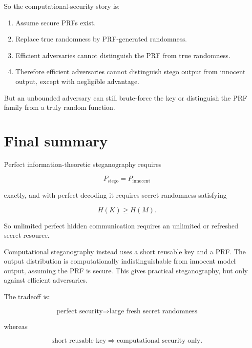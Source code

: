 \documentclass[11pt]{article}
\begin{document}
So the computational-security story is:

\begin{enumerate}[label=\arabic*.]
    \item Assume secure PRFs exist.
    \item Replace true randomness by PRF-generated randomness.
    \item Efficient adversaries cannot distinguish the PRF from true randomness.
    \item Therefore efficient adversaries cannot distinguish stego output from innocent output, except with negligible advantage.
\end{enumerate}

But an unbounded adversary can still brute-force the key or distinguish the PRF family from a truly random function.

\section{Final summary}

Perfect information-theoretic steganography requires

\[
P_{\text{stego}}=P_{\text{innocent}}
\]

exactly, and with perfect decoding it requires secret randomness satisfying

\[
H(K)\ge H(M).
\]

So unlimited perfect hidden communication requires an unlimited or refreshed secret resource.

Computational steganography instead uses a short reusable key and a PRF. The output distribution is computationally indistinguishable from innocent model output, assuming the PRF is secure. This gives practical steganography, but only against efficient adversaries.

The tradeoff is:

\[
\text{perfect security}
\Rightarrow
\text{large fresh secret randomness}
\]

whereas

\[
\text{short reusable key}
\Rightarrow
\text{computational security only}.
\]

\end{document}
